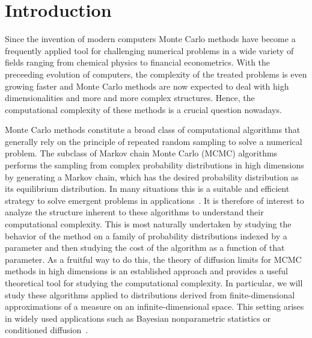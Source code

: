 \chapter{Introduction}
\label{sec:introduction}

Since the invention of modern computers Monte Carlo methods have become a frequently applied tool for challenging numerical problems in a wide variety of fields ranging from chemical physics to financial econometrics. With the preceeding evolution of computers, the complexity of the treated problems is even growing faster and Monte Carlo methods are now expected to deal with high dimensionalities and more and more complex structures. Hence, the computational complexity of these methods is  a crucial question nowadays.

Monte Carlo methods constitute a broad class of computational algorithms that generally rely on the principle of repeated random sampling to solve a numerical problem. The subclass of Markov chain Monte Carlo (MCMC) algorithms~\autocite{Robert2005}  performs the sampling from complex probability distributions in high dimensions by generating a Markov chain, which has the desired probability distribution as its equilibrium distribution. In many situations this is a suitable and efficient strategy to solve emergent problems in applications~\autocite{Liu2004, Robert2005}. It is therefore of interest to analyze the structure inherent to these algorithms to understand their computational complexity. This is most naturally undertaken by studying the behavior of the method on a family of probability distributions indexed by a parameter and then studying the cost of the algorithm as a function of that parameter. As a fruitful way to do this, the theory of  diffusion limits for MCMC methods in high dimensions is an established approach and provides a useful theoretical tool for studying the computational complexity. In particular, we will study these algorithms applied to  distributions derived from finite-dimensional approximations of a measure on an infinite-dimensional space. This setting arises in widely used applications such as Bayesian nonparametric statistics or conditioned diffusion~\autocite{Beskos2008, Beskos2009, Dashti2012, Dashti2013, Delyon2006, Hairer2011, Stuart2010}.
\newline

